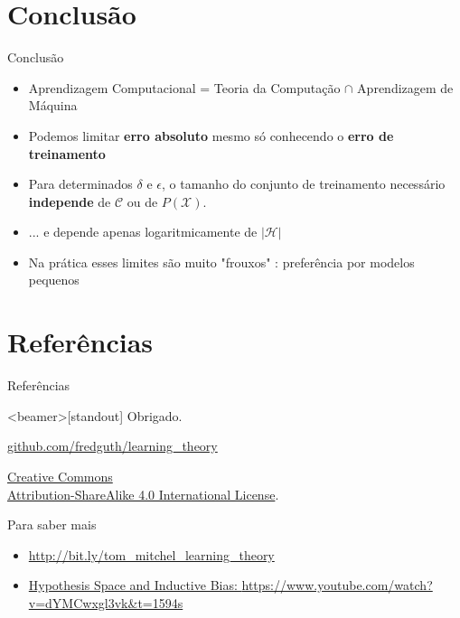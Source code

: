 \documentclass[10pt, professionalfonts]{beamer}
\begin{document}
{

  \AtBeginSection{}
\section{Conclusão}
\begin{frame}{Conclusão}
  \begin{itemize}[<+->]
    \item Aprendizagem Computacional = Teoria da Computação $\cap$  Aprendizagem de Máquina
    \item Podemos limitar \textbf{erro absoluto} mesmo só conhecendo o \textbf{erro de treinamento}
    \item Para determinados $\delta$ e $\epsilon$, o tamanho do conjunto de treinamento necessário \textbf{independe} de $\mathcal{C}$ ou  de $P(\mathcal{X})$.
    \item ... e depende apenas logaritmicamente de $|\mathcal{H}|$
    \item Na prática esses limites são muito "frouxos" \cite{MitchelPAC}: preferência por modelos pequenos
    \end{itemize}
\end{frame}
}
{

  \AtBeginSection{}
\section{Referências}
\begin{frame}[allowframebreaks]{Referências}

  
  

\end{frame}
}
\begin{frame}<beamer>[standout]
  Obrigado.
  \vspace*{.5cm}
\begin{center}\href{https://github.com/fredguth/learning_theory.git}{\url{github.com/fredguth/learning_theory}}\end{center}
  \vspace*{.5cm}
  \small{
    \begin{center}\ccbysa\end{center}
    \href{http://creativecommons.org/licenses/by-sa/4.0/}{Creative Commons \\
      Attribution-ShareAlike 4.0 International License}.
  }
\end{frame}

\appendix

\begin{frame}[fragile]{Para saber mais}
  \begin{itemize}
    \item \href{http://bit.ly/tom_mitchel_learning_theory}{\url{http://bit.ly/tom_mitchel_learning_theory}}
    \item \href{https://www.youtube.com/watch?v=dYMCwxgl3vk&t=1594s}{Hypothesis Space and Inductive Bias: \url{https://www.youtube.com/watch?v=dYMCwxgl3vk&t=1594s}}
  \end{itemize}
\end{frame}
\end{document}
